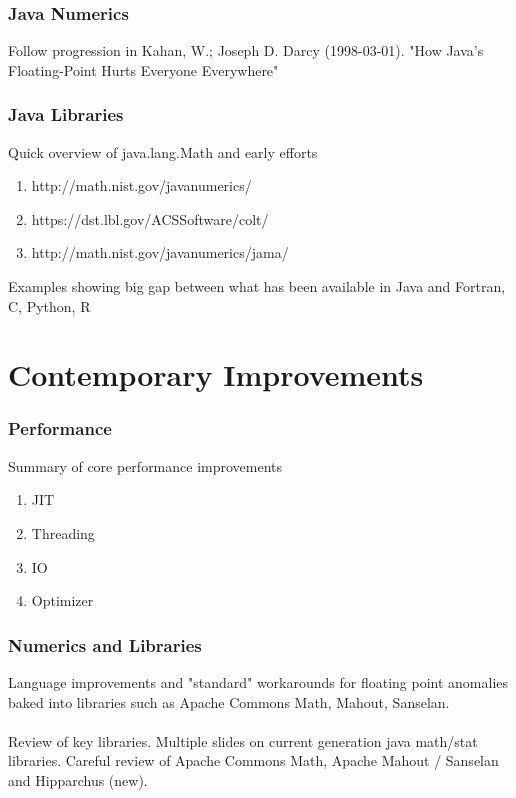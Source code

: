 \documentclass[14pt,mathserif]{beamer}
\begin{document}
\begin{frame}
  \frametitle{Java Numerics}
Follow progression in
Kahan, W.; Joseph D. Darcy (1998-03-01). "How Java's Floating-Point Hurts Everyone Everywhere"

\end{frame}

\begin{frame}
  \frametitle{Java Libraries}
Quick overview of java.lang.Math and early efforts 
\begin{enumerate}
\item http://math.nist.gov/javanumerics/
\item https://dst.lbl.gov/ACSSoftware/colt/
\item http://math.nist.gov/javanumerics/jama/
\end{enumerate}
Examples showing big gap between what has been available in Java and Fortran, C, Python, R
\end{frame}

\section[History]{Contemporary Improvements}

\begin{frame}
  \frametitle{Performance}
  Summary of core performance improvements
  \begin{enumerate}
  \item JIT
  \item Threading
  \item IO
  \item Optimizer
  \end{enumerate}
\end{frame}

\begin{frame}
  \frametitle{Numerics and Libraries}
  Language improvements and "standard" workarounds for floating point anomalies baked 
  into libraries such as Apache Commons Math, Mahout, Sanselan.  
  \\
  \\
  Review of key libraries. Multiple slides on current generation java math/stat libraries.  Careful review of Apache Commons Math, Apache Mahout / Sanselan and Hipparchus (new).
\end{frame}
\end{document}

